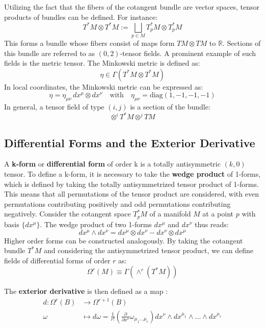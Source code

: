 Utilizing the fact that the fibers of the cotangent bundle are vector spaces, tensor products of bundles can be defined. For instance:
\[
T^*M \otimes T^*M := \bigsqcup_{p \in M} T_p^*M \otimes T_p^*M
\]
This forms a bundle whose fibers consist of maps form $TM \otimes TM$ to $\mathbb{R}$. Sections of this bundle are referred to as \((0,2)\)-tensor fields. A prominent example of such fields is the metric tensor. The Minkowski metric is defined as:
\[
\eta \in \Gamma(T^*M \otimes T^*M)
\]
In local coordinates, the Minkowski metric can be expressed as:
\[
\eta = \eta_{\mu\nu} \, dx^\mu \otimes dx^\nu
\quad \text{with} \quad \eta_{\mu\nu} = \text{diag}(1, -1, -1, -1)
\]
In general, a tensor field of type $(i,j)$ is a section of the bundle\cite{NakaharaGeometrytopologyphysics2005}:
\[ \otimes^iT^*M \otimes^jTM \]


\subsection{Differential Forms and the Exterior Derivative}
A \textbf{k-form} or \textbf{differential form} of order k is a totally antisymmetric $(k,0)$ tensor. To define a k-form, it is necessary to take the \textbf{wedge product} of 1-forms, which is defined by taking the totally antisymmetrized tensor product of 1-forms. This means that all permutations of the tensor product are considered, with even permutations contributing positively and odd permutations contributing negatively. Consider the cotangent space $T_p^*M$ of a manifold $M$ at a point $p$ with basis $\{dx^\mu\}$. The wedge product of two 1-forms \(dx^\mu\) and \(dx^\nu\) thus reads:
\[
dx^\mu \wedge dx^\nu = dx^\mu \otimes dx^\nu - dx^\nu \otimes dx^\mu
\]
Higher order forms can be constructed analogously. By taking the cotangent bundle \(T^*M\) and considering the antisymmetrized tensor product, we can define fields of differential forms of order \(r\) as:
\[\Omega^r(M) \equiv \Gamma(\wedge^r (T^*M))\]

The \textbf{exterior derivative} is then defined as a map \cite{NakaharaGeometrytopologyphysics2005}:
\begin{align*}
  d: \Omega^r(B) &\to \Omega^{r+1}(B) \\
  \omega &\mapsto d\omega = \frac{1}{r!}\left( \frac{\partial}{ \partial x^\nu} \omega_{\mu_1 \dots \mu_r} \right) dx^\nu \wedge dx^{\mu_1} \wedge \dots \wedge dx^{\mu_r}
\end{align*}

